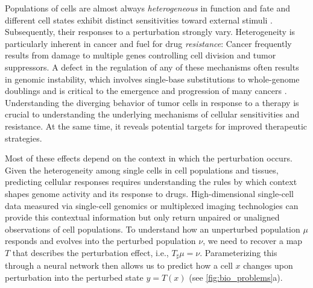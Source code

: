 Populations of cells are almost always \emph{heterogeneous} in function and fate and different cell states exhibit distinct sensitivities toward external stimuli \citep{spiller2010measurement}.
Subsequently, their responses to a perturbation strongly vary.
Heterogeneity is particularly inherent in cancer and fuel for drug \emph{resistance}: 
Cancer frequently results from damage to multiple genes controlling cell division and tumor suppressors.
A defect in the regulation of any of these mechanisms often results in genomic instability, which involves single-base substitutions to whole-genome doublings and
is critical to the emergence and progression of many cancers \citep{dagogo2018tumour}. Understanding the diverging behavior of tumor cells in response to a therapy is crucial to understanding the underlying mechanisms of cellular sensitivities and resistance.
At the same time, it reveals potential targets for improved therapeutic strategies.

Most of these effects depend on the context in which the perturbation occurs. Given the heterogeneity among single cells in cell populations and tissues, predicting cellular responses requires understanding the rules by which context shapes genome activity and its response to drugs. High-dimensional single-cell data measured via single-cell genomics or multiplexed imaging technologies can provide this contextual information but only return unpaired or unaligned observations of cell populations.
To understand how an unperturbed population $\mu$ responds and evolves into the perturbed population $\nu$, we need to recover a map $T$ that describes the perturbation effect, i.e., $T_\sharp \mu = \nu$. Parameterizing this through a neural network then allows us to predict how a cell $x$ changes upon perturbation into the perturbed state $y= T(x)$ (see \cref{fig:bio_problems}a).



